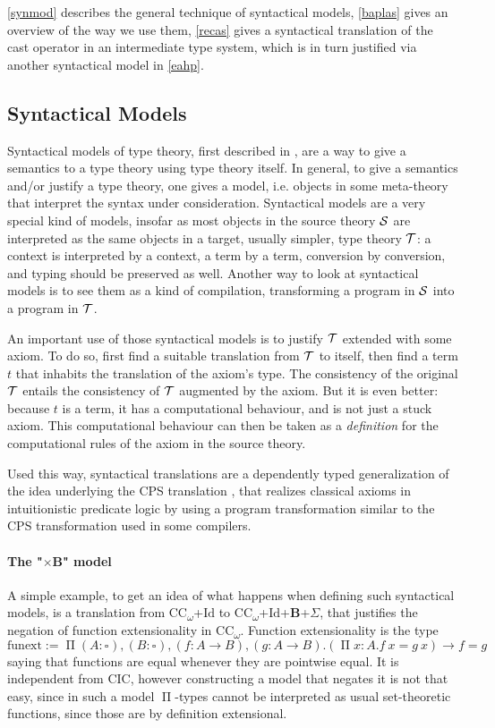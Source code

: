 \documentclass[en]{myarticle}
\renewcommand{\mathtt}{\mathrm}
\newcommand{\uni}[1][]{\square_{#1}}
\renewcommand{\P}{\operatorname{\Pi}}
\DeclareMathOperator{\?}{?}
\newcommand{\bool}{\mathbf{B}}
\newcommand{\coc}{CC\textsubscript{$\omega$}}
\begin{document}
{\autoref{synmod} describes the general technique of syntactical models, \autoref{baplas} gives an overview of the way we use them, \autoref{recas} gives a syntactical translation of the cast operator in an intermediate type system, which is in turn justified via another syntactical model in \autoref{eahp}.

\subsection{Syntactical Models}
\label{synmod}

Syntactical models of type theory, first described in \cite{Boulier2017}, are a way to give a semantics to a type theory using type theory itself. In general, to give a semantics and/or justify a type theory, one gives a model, i.e. objects in some meta-theory that interpret the syntax under consideration. Syntactical models are a very special kind of models, insofar as most objects in the source theory $\mathcal{S}$ are interpreted as the same objects in a target, usually simpler, type theory $\mathcal{T}$: a context is interpreted by a context, a term by a term, conversion by conversion, and typing should be preserved as well. Another way to look at syntactical models is to see them as a kind of compilation, transforming a program in $\mathcal{S}$ into a program in $\mathcal{T}$.

An important use of those syntactical models is to justify $\mathcal{T}$ extended with some axiom. To do so, first find a suitable translation from $\mathcal{T}$ to itself, then find a term $t$ that inhabits the translation of the axiom's type. The consistency of the original $\mathcal{T}$ entails the consistency of $\mathcal{T}$ augmented by the axiom. But it is even better: because $t$ is a term, it has a computational behaviour, and is not just a stuck axiom. This computational behaviour can then be taken as a \emph{definition} for the computational rules of the axiom in the source theory.

Used this way, syntactical translations are a dependently typed generalization of the idea underlying the CPS translation \cite{Griffin1990}, that realizes classical axioms in intuitionistic predicate logic by using a program transformation similar to the CPS transformation used in some compilers.

\paragraph{The "$\times \bool$" model}

A simple example, to get an idea of what happens when defining such syntactical models, is a translation from \coc+$\mathtt{Id}$ to \coc+$\mathtt{Id}$+$\bool$+$\Sigma$, that justifies the negation of function extensionality in \coc. Function extensionality is the type
\[\mathtt{funext} := \P (A : \uni), (B : \uni), (f : A \to B), (g : A \to B). (\P x : A. f~x = g~x) \to f = g \]
saying that functions are equal whenever they are pointwise equal. It is independent from CIC, however constructing a model that negates it is not that easy, since in such a model $\P$-types cannot be interpreted as usual set-theoretic functions, since those are by definition extensional.

}
\end{document}

